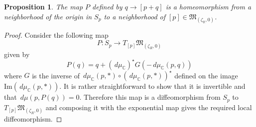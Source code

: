 \documentclass[12pt,oneside,reqno]{amsart}
\newtheorem{proposition}[theorem]{Proposition}
\theoremstyle{definition}
\numberwithin{equation}{section}
\numberwithin{theorem}{section}
\newcommand{\R}{\mathbb{R}}
\newcommand{\C}{\mathbb{C}}
\begin{document}
%
\begin{proposition}\label{HLH}
The map $P$ defined by  $q \to [p+q]$ is a homeomorphism from a neighborhood of the origin in $S_p$ to a neighborhood of $[p]\in \mathfrak M_{(\zeta_{\R},0)}$. 
\end{proposition}
%

%
\begin{proof}
Consider the following map 
%
\begin{equation*}
P:S_p \to T_{[p]}\mathfrak M_{(\zeta_{R},0)}
\end{equation*}
% 
given by 
%
\begin{equation*}
P(q ) = q + (\,d\mu_{\C})^{\star}G(-\,d\mu_{\C}(p,q))
\end{equation*}
%
where $G$ is the inverse of $\,d\mu_{\C}(p, *)\circ (\,d\mu_{\C}(p,*))^{\star}$ defined on the image $\mathrm{Im}(\,d\mu_{\C}(p,*))$. It is rather straightforward to show that it is invertible and that $\,d\mu(p,P(q)) = 0$. Therefore this map is a diffeomorphism from $S_p$ to $T_{[p]}\mathfrak M_{(\zeta_{R},0)}$ and composing it with the exponential map gives the required local diffeomorphism. 
\end{proof}
%
\end{document}
